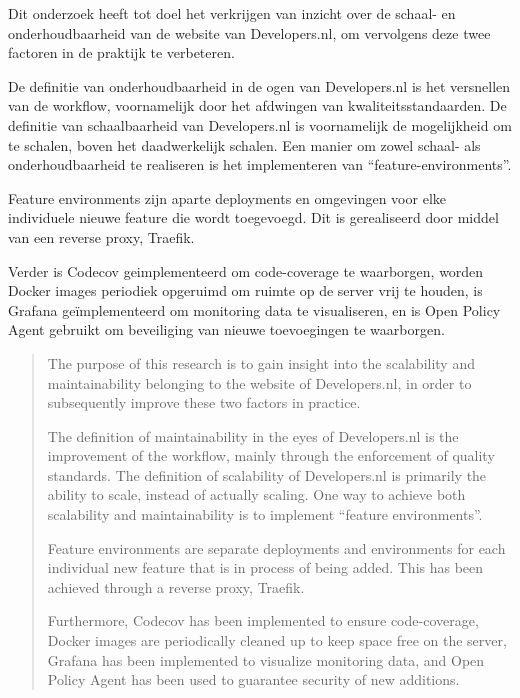\documentclass[
11pt, %
english, %
singlespacing, %
headsepline, %
]{formatting} %
\begin{document}

\begin{samenvatting}
Dit onderzoek heeft tot doel het verkrijgen van inzicht over de schaal- en onderhoudbaarheid van de website van Developers.nl, om vervolgens deze twee factoren in de praktijk te verbeteren.

De definitie van onderhoudbaarheid in de ogen van Developers.nl is het versnellen van de workflow, voornamelijk door het afdwingen van kwaliteitsstandaarden. De definitie van schaalbaarheid van Developers.nl is voornamelijk de mogelijkheid om te schalen, boven het daadwerkelijk schalen. Een manier om zowel schaal- als onderhoudbaarheid te realiseren is het implementeren van \enquote{feature-environments}. 

Feature environments zijn aparte deployments en omgevingen voor elke individuele nieuwe feature die wordt toegevoegd. Dit is gerealiseerd door middel van een reverse proxy, Traefik.

Verder is Codecov geimplementeerd om code-coverage te waarborgen, worden Docker images periodiek opgeruimd om ruimte op de server vrij te houden, is Grafana geïmplementeerd om monitoring data te visualiseren, en is Open Policy Agent gebruikt om beveiliging van nieuwe toevoegingen te waarborgen.
\end{samenvatting}


\begin{abstract}
The purpose of this research is to gain insight into the scalability and maintainability belonging to the website of Developers.nl, in order to subsequently improve these two factors in practice.

The definition of maintainability in the eyes of Developers.nl is the improvement of the workflow, mainly through the enforcement of quality standards. The definition of scalability of Developers.nl is primarily the ability to scale, instead of actually scaling. One way to achieve both scalability and maintainability is to implement \enquote{feature environments}.

Feature environments are separate deployments and environments for each individual new feature that is in process of being added. This has been achieved through a reverse proxy, Traefik.

Furthermore, Codecov has been implemented to ensure code-coverage, Docker images are periodically cleaned up to keep space free on the server, Grafana has been implemented to visualize monitoring data, and Open Policy Agent has been used to guarantee security of new additions.
\end{abstract}
\end{document}
